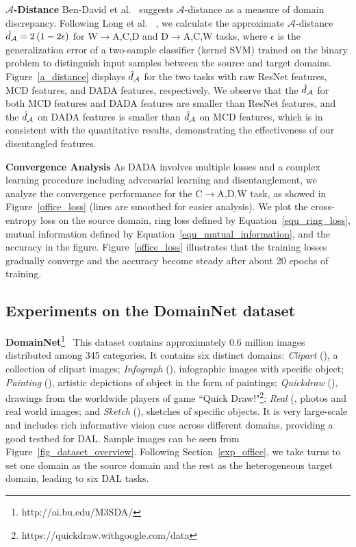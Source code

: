 \documentclass{article}
\newcommand{\BV}[1]{\color{black!10!blue}{\em #1}}
\begin{document}
\textbf{$\mathcal{A}$-Distance} Ben-David et al.~ suggests $\mathcal{A}$-distance as a measure of domain discrepancy. Following Long et al. ~, we calculate the approximate $\mathcal{A}$-distance ${\hat d_{\cal A}} = 2\left( {1 - 2\epsilon } \right)$ for W$\rightarrow$A,C,D and D$\rightarrow$A,C,W tasks, where $\epsilon$ is the generalization error of a two-sample classifier (kernel SVM) trained on the binary problem to distinguish input samples between the source and target domains. Figure~\ref{a_distance} displays ${\hat d}_{\cal A}$ for the two tasks with raw ResNet features, MCD features, and DADA features, respectively. We observe that the ${\hat d}_{\cal A}$ for both MCD features and DADA features are smaller than ResNet features, and the ${\hat d}_{\cal A}$ on DADA features is smaller than ${\hat d}_{\cal A}$ on MCD features, which is in consistent with the quantitative results, demonstrating the effectiveness of our disentangled features. 

\textbf{Convergence Analysis} As DADA involves multiple losses and a complex learning procedure including adversarial learning and disentanglement, we analyze the convergence performance for the C$\rightarrow$A,D,W task, as showed in Figure~\ref{office_loss} (lines are smoothed for easier analysis). We plot the cross-entropy loss on the source domain, ring loss defined by Equation~\ref{equ_ring_loss}, mutual information defined by Equation~\ref{equ_mutual_information}, and the accuracy in the figure. Figure~\ref{office_loss} illustrates that the training losses gradually converge and the accuracy become steady after about 20 epochs of training.


\subsection{Experiments on the DomainNet dataset}
\textbf{DomainNet}\footnote{http://ai.bu.edu/M3SDA/}~\cite{domainnet} This dataset contains approximately 0.6 million images distributed among 345 categories. It contains six distinct domains: \textit{Clipart} ({\BV{clp}}), a collection of clipart images; \textit{Infograph} ({\BV{inf}}), infographic images with specific object; \textit{Painting} ({\BV{pnt}}), artistic depictions of object in the form of paintings; \textit{Quickdraw} ({\BV{qdr}}), drawings from the worldwide players of game ``Quick Draw!"\footnote{https://quickdraw.withgoogle.com/data}; \textit{Real} ({\BV{rel}}, photos and real world images; and \textit{Sketch} ({\BV{skt}}), sketches of specific objects. It is very large-scale and includes rich informative vision cues across different domains, providing a good testbed for DAL. Sample images can be seen from Figure~\ref{fig_dataset_overview}. Following Section~\ref{exp_office}, we take turns to set one domain as the source domain and the rest as the heterogeneous target domain, leading to six DAL tasks. 
\end{document}
